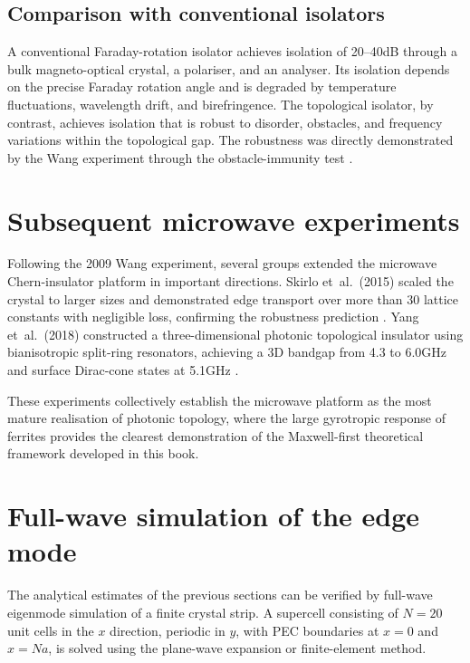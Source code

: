 \subsection{Comparison with conventional isolators}
\label{sec:ch9-comparison-isolator}

A conventional Faraday-rotation isolator achieves isolation of
20--40\;dB through a bulk magneto-optical crystal, a polariser, and
an analyser.  Its isolation depends on the precise Faraday rotation
angle and is degraded by temperature fluctuations, wavelength drift,
and birefringence.  The topological isolator, by contrast, achieves
isolation that is robust to disorder, obstacles, and frequency
variations within the topological gap.  The robustness was directly
demonstrated by the Wang experiment through the obstacle-immunity
test \cite{ozawa2018topological,price2022roadmap}.

\section{Subsequent microwave experiments}
\label{sec:ch9-subsequent-detail}

Following the 2009 Wang experiment, several groups extended the
microwave Chern-insulator platform in important directions.  Skirlo
et~al.\ (2015) scaled the crystal to larger sizes and demonstrated
edge transport over more than 30 lattice constants with negligible
loss, confirming the robustness prediction
\cite{skirlo2015experimental}.  Yang et~al.\ (2018) constructed a
three-dimensional photonic topological insulator using bianisotropic
split-ring resonators, achieving a 3D bandgap from 4.3 to 6.0\;GHz
and surface Dirac-cone states at 5.1\;GHz
\cite{yang2018realization,price2022roadmap}.

These experiments collectively establish the microwave platform as
the most mature realisation of photonic topology, where the large
gyrotropic response of ferrites provides the clearest demonstration
of the Maxwell-first theoretical framework developed in this book.

\section{Full-wave simulation of the edge mode}
\label{sec:ch9-simulation}

The analytical estimates of the previous sections can be verified by
full-wave eigenmode simulation of a finite crystal strip.  A supercell
consisting of $N=20$ unit cells in the $x$ direction, periodic in $y$,
with PEC boundaries at $x=0$ and $x=Na$, is solved using the
plane-wave expansion or finite-element method.

